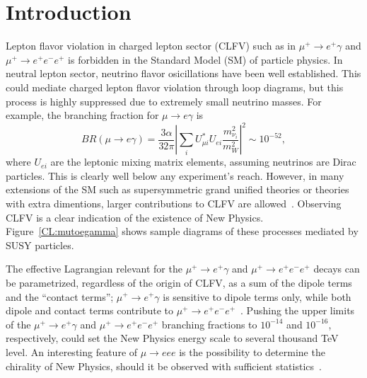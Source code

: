 \section{Introduction}
\label{sec:intro}

Lepton flavor violation in charged lepton sector (CLFV) such as in 
$\mu^+\to e^+\gamma$ and $\mu^+\to e^+e^-e^+$ is forbidden in
the Standard Model (SM) of particle physics. In neutral lepton sector,
neutrino flavor osicillations have been well established. This could 
mediate charged lepton flavor violation through loop diagrams, but this
process is highly suppressed due to extremely small neutrino masses. 
For example, the branching fraction for
$\mu \to e \gamma$ is~\cite{xxx}
\begin{equation}
BR(\mu \rightarrow e \gamma)=\frac{3\alpha}{32\pi}\left|\sum_i U_{\mu
i}^* U_{e i}\frac{m_{\nu_{i}}^2}{m_{W}^2}\right|^2 \sim 10^{-52},
\end{equation}
where $U_{ei}$ are the leptonic mixing matrix elements, assuming neutrinos
are Dirac particles. This is clearly well below any experiment's reach.
However, in many extensions of the SM such as supersymmetric grand unified
theories or theories with extra dimentions, larger contributions to CLFV are
allowed~\cite{new physics}. Observing CLFV is a clear indication of the 
existence of New Physics. Figure~\ref{CL:mutoegamma} shows sample diagrams
of these processes mediated by SUSY particles.

The effective Lagrangian relevant for the $\mu^+\to e^+\gamma$ and $\mu^+\to e^+e^-e^+$
decays can be parametrized, regardless of the origin of CLFV, as a sum of
the dipole terms and the ``contact terms''; $\mu^+\to e^+\gamma$ is sensitive to
dipole terms only, while both dipole and contact terms contribute to 
$\mu^+\to e^+e^-e^+$~\cite{deGouvea:2013zba}. Pushing the upper limits of
the $\mu^+\to e^+\gamma$ and $\mu^+\to e^+e^-e^+$ branching fractions 
to $10^{-14}$ and $10^{-16}$, respectively, could set the New Physics energy
scale to several thousand TeV level.
An interesting feature of $\mu \rightarrow eee$ is 
the possibility to determine the chirality of New Physics, should it be 
observed with sufficient statistics~\cite{Okada:1999zk}. 

